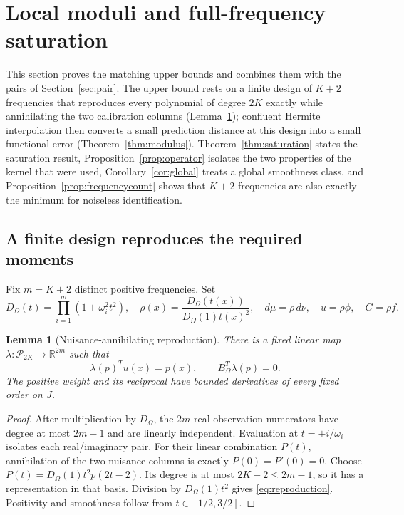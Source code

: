 \documentclass[10pt]{amsart}
\newtheorem{lemma}[theorem]{Lemma}
\theoremstyle{definition}
\theoremstyle{remark}
\theoremstyle{plain}
\newcommand{\R}{\mathbb R}
\newcommand{\Pp}{\mathcal P}
\begin{document}
\section{Local moduli and full-frequency saturation}\label{sec:diameter}
This section proves the matching upper bounds and combines them with the pairs of Section~\ref{sec:pair}. The upper bound rests on a finite design of $K+2$ frequencies that reproduces every polynomial of degree $2K$ exactly while annihilating the two calibration columns (Lemma~\ref{lem:reproduction}); confluent Hermite interpolation then converts a small prediction distance at this design into a small functional error (Theorem~\ref{thm:modulus}). Theorem~\ref{thm:saturation} states the saturation result, Proposition~\ref{prop:operator} isolates the two properties of the kernel that were used, Corollary~\ref{cor:global} treats a global smoothness class, and Proposition~\ref{prop:frequencycount} shows that $K+2$ frequencies are also exactly the minimum for noiseless identification.
\subsection{A finite design reproduces the required moments}
Fix $m=K+2$ distinct positive frequencies. Set
\[
 D_\Omega(t)=\prod_{i=1}^m(1+\omega_i^2t^2),\quad
 \rho(x)=\frac{D_\Omega(t(x))}{D_\Omega(1)t(x)^2},\quad
 d\mu=\rho\,d\nu,\quad u=\rho\phi,\quad G=\rho f.
\]
\begin{lemma}[Nuisance-annihilating reproduction]\label{lem:reproduction}
There is a fixed linear map $\lambda:\Pp_{2K}\to\R^{2m}$ such that
\begin{equation}\label{eq:reproduction}
 \lambda(p)^Tu(x)=p(x),\qquad B_\Omega^T\lambda(p)=0.
\end{equation}
The positive weight and its reciprocal have bounded derivatives of every fixed order on $J$.
\end{lemma}
\begin{proof}
After multiplication by $D_\Omega$, the $2m$ real observation numerators have degree at most $2m-1$ and are linearly independent. Evaluation at $t=\pm i/\omega_i$ isolates each real/imaginary pair. For their linear combination $P(t)$, annihilation of the two nuisance columns is exactly $P(0)=P'(0)=0$. Choose $P(t)=D_\Omega(1)t^2p(2t-2)$. Its degree is at most $2K+2\le2m-1$, so it has a representation in that basis. Division by $D_\Omega(1)t^2$ gives \eqref{eq:reproduction}. Positivity and smoothness follow from $t\in[1/2,3/2]$.
\end{proof}
\end{document}
